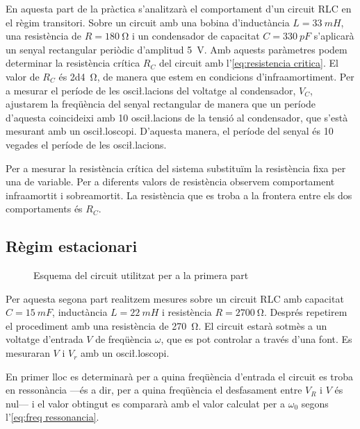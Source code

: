 En aquesta part de la pràctica s'analitzarà el comportament d'un circuit RLC en el règim transitori. Sobre un circuit amb una bobina d'inductància \( L = \SI{33}{mH} \), una resistència de \( R = \SI{180}{\ohm} \) i un condensador de capacitat \( C  = \SI{330}{pF} \) s'aplicarà un senyal rectangular periòdic d'amplitud \SI{5}{V}. Amb aquests paràmetres podem determinar la resistència crítica \( R_C \) del circuit amb l'\cref{eq:resistencia critica}. El valor de \( R_C \) és \SI{2d4}{\ohm}, de manera que estem en condicions d'infraamortiment. Per a mesurar el període de les osci\l.lacions del voltatge al condensador, \( V_C \), ajustarem la freqüència del senyal rectangular de manera que un període d'aquesta coincideixi amb 10 osci\l.lacions de la tensió al condensador, que s'està mesurant amb un osci\l.loscopi. D'aquesta manera, el període del senyal és 10 vegades el període de les osci\l.lacions.

Per a mesurar la resistència crítica del sistema substituïm la resistència fixa per una de variable. Per a diferents valors de resistència observem comportament infraamortit i sobreamortit. La resistència que es troba a la frontera entre els dos comportaments és \( R_C \).  

\subsection{Règim estacionari}
\begin{figure}[htb]
	\centering \small \sffamily
	
	\caption{Esquema del circuit utilitzat per a la primera part}
	\label{fig:esquema estacionari}
\end{figure}

Per aquesta segona part realitzem mesures sobre un circuit RLC amb capacitat \( C = \SI{15}{mF} \), inductància \( L = \SI{22}{mH} \) i resistència \( R = \SI{2700}{\ohm} \). Després repetirem el procediment amb una resistència de \SI{270}{\ohm}. El circuit estarà sotmès a un voltatge d'entrada \( V \) de freqüència \( \omega \), que es pot controlar a través d'una font. Es mesuraran \( V \) i \( V_r \) amb un osci\l.loscopi.  

En primer lloc es determinarà per a quina freqüència d'entrada el circuit es troba en ressonància ---és a dir, per a quina freqüència el desfasament entre \( V_R \) i \( V \) és nul--- i el valor obtingut es compararà amb el valor calculat per a \( \omega_0 \) segons l'\cref{eq:freq ressonancia}. 

